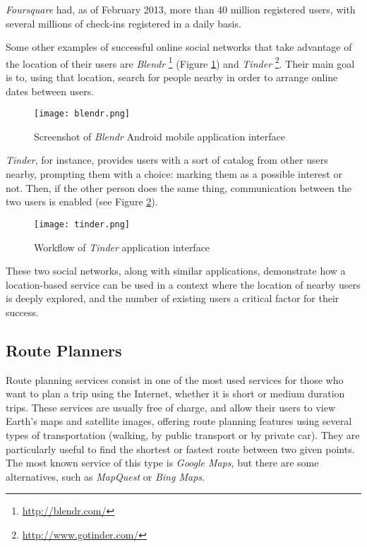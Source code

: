 \emph{Foursquare} had, as of February 2013, more than 40 million registered users, with several millions of check-ins registered in a daily basis.

Some other examples of successful online social networks that take advantage of the location of their users are \emph{Blendr} \footnote{\url{http://blendr.com/}} (Figure \ref{fig:blndr}) and \emph{Tinder} \footnote{\url{http://www.gotinder.com/}}. Their main goal is to, using that location, search for people nearby in order to arrange online dates between users.

\begin{figure}[h!]
  \begin{center}
    \leavevmode
    \texttt{[image: blendr.png]}
    \caption{Screenshot of \emph{Blendr} Android mobile application interface}
    \label{fig:blndr}
  \end{center}
\end{figure}

\emph{Tinder}, for instance, provides users with a sort of catalog from other users nearby, prompting them with a choice: marking them as a possible interest or not. Then, if the other person does the same thing, communication between the two users is enabled (see Figure \ref{fig:tindr}). 

\begin{figure}[h!]
  \begin{center}
    \leavevmode
    \texttt{[image: tinder.png]}
    \caption{Workflow of \emph{Tinder} application interface}
    \label{fig:tindr}
  \end{center}
\end{figure}

These two social networks, along with similar applications, demonstrate how a location-based service can be used in a context where the location of nearby users is deeply explored, and the number of existing users a critical factor for their success.

\pagebreak

\subsection{Route Planners}

Route planning services consist in one of the most used services for those who want to plan a trip using the Internet, whether it is short or medium duration trips. 
These services are usually free of charge, and allow their users to view Earth's maps and satellite images, offering route planning features using several types of transportation (walking, by public transport or by private car). They are particularly useful to find the shortest or fastest route between two given points. 
The most known service of this type is \emph{Google Maps}, but there are some alternatives, such as \emph{MapQuest} or \emph{Bing Maps}.

